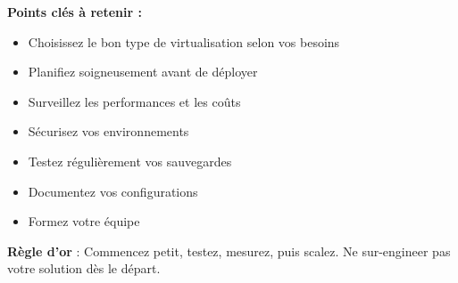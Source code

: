 \documentclass[11pt,a4paper]{article}
\begin{document}
\textbf{Points clés à retenir :}
\begin{itemize}
    \item Choisissez le bon type de virtualisation selon vos besoins
    \item Planifiez soigneusement avant de déployer
    \item Surveillez les performances et les coûts
    \item Sécurisez vos environnements
    \item Testez régulièrement vos sauvegardes
    \item Documentez vos configurations
    \item Formez votre équipe
\end{itemize}

\begin{importantbox}
\textbf{Règle d'or} : Commencez petit, testez, mesurez, puis scalez. Ne sur-engineer pas votre solution dès le départ.
\end{importantbox}
\end{document}
